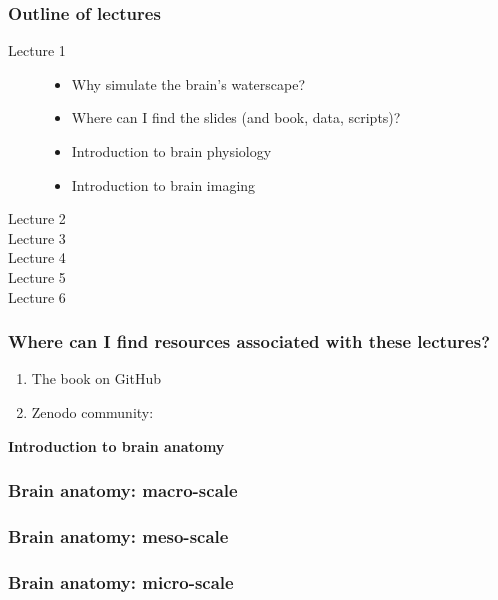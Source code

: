\documentclass[mathserif, aspectratio=169]{beamer}
\newcommand{\mysection}[1]{\begin{frame} \begin{center} \vspace{3em} \textbf{#1} \end{center} \end{frame}}
\begin{document}
{
\begin{frame}
\end{frame}
}


\begin{frame}
  \frametitle{Outline of lectures}
  \begin{description}
    \item[Lecture 1]
      \begin{itemize}
      \item
        Why simulate the brain's waterscape?
      \item
        Where can I find the slides (and book, data, scripts)?
      \item
        Introduction to brain physiology
      \item
        Introduction to brain imaging
      \end{itemize}
    \item[Lecture 2] 
    \item[Lecture 3]
    \item[Lecture 4]
    \item[Lecture 5]
    \item[Lecture 6]
  \end{description}

\end{frame}

\begin{frame}
  \frametitle{Where can I find resources associated with these lectures?}
  \begin{enumerate}
  \item
    The book on GitHub
  \item
    Zenodo community:
  \end{enumerate}
\end{frame}

%
% 
%

\mysection{Introduction to brain anatomy}

\begin{frame}
  \frametitle{Brain anatomy: macro-scale}
\end{frame}

\begin{frame}
  \frametitle{Brain anatomy: meso-scale}
\end{frame}

\begin{frame}
  \frametitle{Brain anatomy: micro-scale}
\end{frame}
\end{document}
